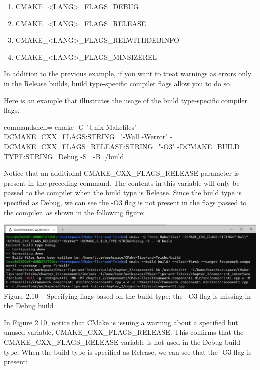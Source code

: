 \begin{enumerate}
\item 
CMAKE\_<LANG>\_FLAGS\_DEBUG

\item 
CMAKE\_<LANG>\_FLAGS\_RELEASE

\item 
CMAKE\_<LANG>\_FLAGS\_RELWITHDEBINFO

\item 
CMAKE\_<LANG>\_FLAGS\_MINSIZEREL
\end{enumerate}

In addition to the previous example, if you want to treat warnings as errors only in the Release builds, build type-specific compiler flags allow you to do so.

Here is an example that illustrates the usage of the build type-specific compiler flags:

\begin{tcblisting}{commandshell={}}
cmake -G "Unix Makefiles" -DCMAKE_CXX_FLAGS:STRING="-Wall
  -Werror" -DCMAKE_CXX_FLAGS_RELEASE:STRING="-O3" -DCMAKE_BUILD_
  TYPE:STRING=Debug -S . -B ./build
\end{tcblisting}

Notice that an additional CMAKE\_CXX\_FLAGS\_RELEASE parameter is present in the preceding command. The contents in this variable will only be passed to the compiler when the build type is Release. Since the build type is specified as Debug, we can see the -O3 flag is not present in the flags passed to the compiler, as shown in the following figure:

\begin{center}
\includegraphics[width=1.\textwidth]{content/1/chapter2/images/10.jpg}\\
Figure 2.10 – Specifying flags based on the build type; the –O3 flag is missing in the Debug build
\end{center}

In Figure 2.10, notice that CMake is issuing a warning about a specified but unused variable, CMAKE\_CXX\_FLAGS\_RELEASE. This confirms that the CMAKE\_CXX\_FLAGS\_RELEASE variable is not used in the Debug build type. When the build type is specified as Release, we can see that the -O3 flag is present:

